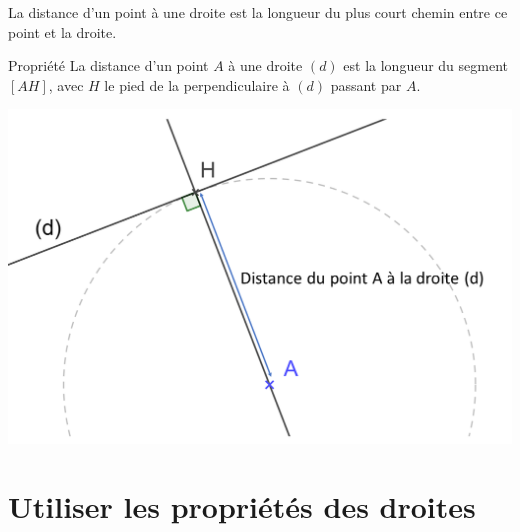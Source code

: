 \documentclass[xcolor={dvipsnames}]{beamer}
\begin{document}
\begin{frame}
	\begin{mydef}
		La distance d’un point à une droite \pause est la longueur du plus court chemin \pause entre ce point et la droite. \pause		
	\end{mydef}

	\begin{alertblock}{Propriété}
			La distance d’un point $A$ à une droite $(d)$ \pause  est la longueur du segment $[AH]$, avec \pause $H$ le pied de la perpendiculaire à $(d)$ passant par $A$. \pause
	\end{alertblock}

	\begin{center}
		\includegraphics[scale=0.25]{lgr_droite}
	\end{center}
\end{frame}

\section{Utiliser les propriétés des droites}
\end{document}

